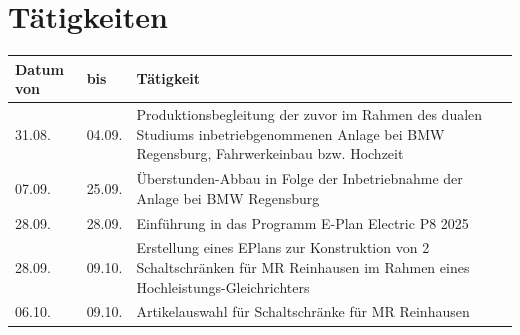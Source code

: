 \section*{Tätigkeiten}

\begin{table}[H]
	\begin{tabularx}{\textwidth}{l l X}
		\textbf{Datum von} & \textbf{bis} & \textbf{Tätigkeit}                                                                                                                        \\
		\toprule
		31.08.             & 04.09.       & Produktionsbegleitung der zuvor im Rahmen des dualen Studiums inbetriebgenommenen Anlage bei BMW Regensburg, Fahrwerkeinbau bzw. Hochzeit \\
		\midrule
		07.09.             & 25.09.       & Überstunden-Abbau in Folge der Inbetriebnahme der Anlage bei BMW Regensburg                                                               \\
		\midrule
		28.09.             & 28.09.       & Einführung in das Programm E-Plan Electric P8 2025                                                                                        \\
		\midrule
		28.09.             & 09.10.       & Erstellung eines EPlans zur Konstruktion von 2 Schaltschränken für MR Reinhausen im Rahmen eines Hochleistungs-Gleichrichters             \\
		\midrule
		06.10.             & 09.10.       & Artikelauswahl für Schaltschränke für MR Reinhausen                                                                                       \\
		\bottomrule
	\end{tabularx}

\end{table}